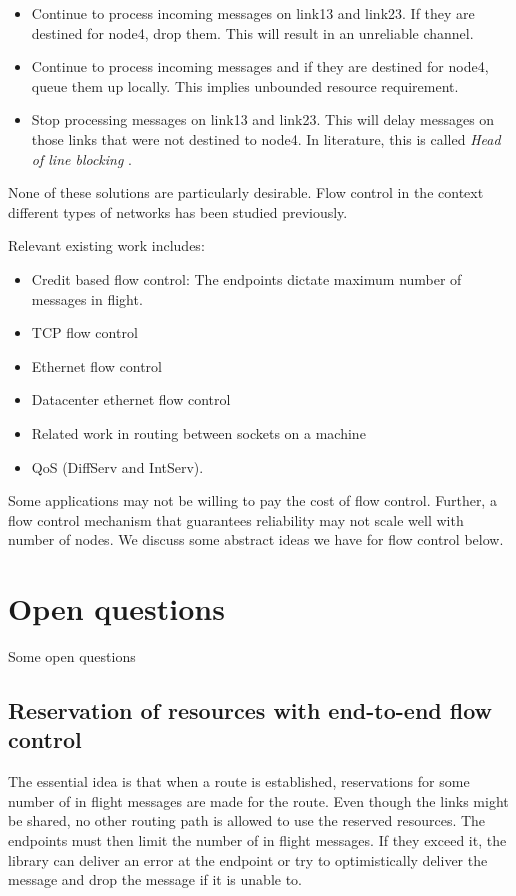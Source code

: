 \documentclass[a4paper,twoside]{report} %
\begin{document}
\begin{itemize}
\item Continue to process incoming messages on link13 and link23.
  If they are destined for node4, drop them.
  This will result in an unreliable channel.
\item Continue to process incoming messages and if they are destined for node4,
  queue them up locally.
  This implies unbounded resource requirement.
\item Stop processing messages on link13 and link23.
  This will delay messages on those links that were not destined to node4.
  In literature, this is called \emph{Head of line blocking} \cite{cite}.
\end{itemize}

None of these solutions are particularly desirable.
Flow control in the context different types of networks has
been studied previously.

Relevant existing work includes:
\begin{itemize}
\item Credit based flow control:
  The endpoints dictate maximum number of messages in flight.
\item TCP flow control
\item Ethernet flow control
\item Datacenter ethernet flow control
\item Related work in routing between sockets on a machine
\item QoS (DiffServ and IntServ).
\end{itemize}

Some applications may not be willing to pay the cost of flow control.
Further, a flow control mechanism that guarantees reliability
may not scale well with  number of nodes.
We discuss some abstract ideas we have for flow control below.

\section{Open questions}
Some open questions

\subsection{Reservation of resources with end-to-end flow control}
The essential idea is that when a route is established,
reservations for some number of in flight messages are made for the route.
Even though the links might be shared,
no other routing path is allowed to use the reserved resources.
The endpoints must then limit the number of in flight messages.
If they exceed it, the library can deliver an error at the endpoint or try to
optimistically deliver the message and drop the message if it is unable to.
\end{document}
